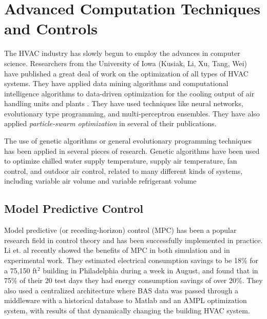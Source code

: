 \section{Advanced Computation Techniques and Controls}

The HVAC industry has slowly begun to employ the advances in computer
science. Researchers from the University of Iowa (Kusiak, Li, Xu, Tang,
Wei) have published a great deal of work on the optimization of all
types of HVAC systems. They have applied data mining algorithms and
computational intelligence algorithms to data-driven optimization for
the cooling output of air handling units and plants
\cite{Kusiak2014MinimizationOfEnergyConsumptionInHVAC, HeXiaofei2014,
Kusiak2013MinimizingEnergyConsumption,
Kusiak2012ModelingAndOptimizationOfHVAC, Kusiak2011MultiObjective,
Kusiak2010ReheatBox, WeiXiupeng2015,
WeiXiupeng2014ModelingAndOptimizationOfAChillerPlant, Kusiak2010,
Kusiak2010ModelingAndOptimization,
Kusiak2011OptimizationOfAnHVACSystemWithAStrength}. They have used
techniques like neural networks, evolutionary type programming, and
multi-perceptron ensembles. They have also applied
\textit{particle-swarm optimization} in several of their publications. 

The use of genetic algorithms or general evolutionary programming
techniques has been applied in several pieces of research. Genetic
algorithms have been used to optimize chilled water supply temperature,
supply air temperature, fan control, and outdoor air control, related to
many different kinds of systems, including variable air volume and
variable refrigerant volume
\cite{Fong2006HVACProgramming,Jin2005Prediction-basedSystems,Parameshwaran2010EnergyAlgorithm,Congradac2009HVACAlgorithms}

\subsection{Model Predictive Control}

Model predictive (or receding-horizon) control (MPC) has been a popular
research field in control theory and has been successfully implemented
in practice. Li et. al \cite{Li2015} recently showed the
benefits of MPC in both simulation and in experimental work. They
estimated electrical consumption savings to be 18\% for a 75,150
ft\(^2\) building in Philadelphia during a week in August, and found
that in 75\% of their 20 test days they had energy consumption savings
of over 20\%. They also used a centralized architecture where BAS data
was passed through a middleware with a historical database to Matlab and
an AMPL optimization system, with results of that dynamically changing
the building HVAC system.

